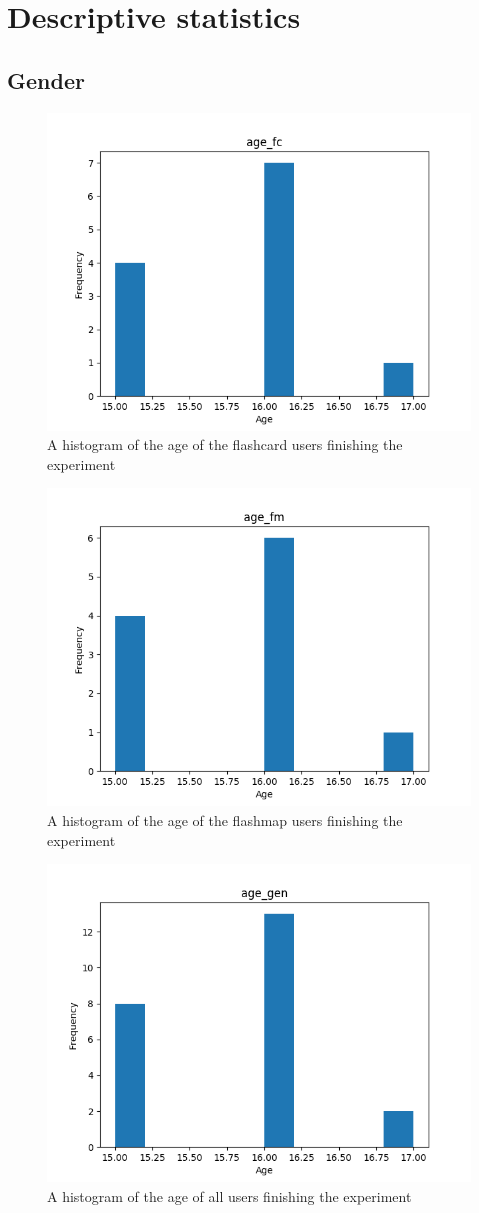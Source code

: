 \chapter{Descriptive statistics}
\label{app:descriptives}

\FloatBarrier
\section{Gender}

\begin{figure}[htbp]
    \centering
    \includegraphics[width=.7\textwidth]{img/age_fc.png}
    \caption{A histogram of the age of the flashcard users finishing the experiment}
\end{figure}
\begin{figure}[htbp]
    \centering
    \includegraphics[width=.7\textwidth]{img/age_fm.png}
    \caption{A histogram of the age of the flashmap users finishing the experiment}
\end{figure}
\begin{figure}[htbp]
    \centering
    \includegraphics[width=.7\textwidth]{img/age_gen.png}
    \caption{A histogram of the age of all users finishing the experiment}
\end{figure}

